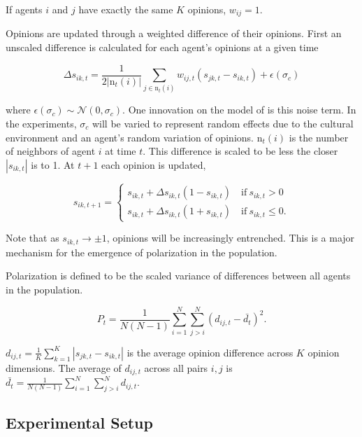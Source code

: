 \documentclass[11pt,letterpaper]{article}
\newcommand{\sigc}{\ensuremath{\sigma_c}}
\begin{document}
\noindent
If agents $i$ and $j$ have exactly the same $K$ opinions, $w_{ij} = 1$. 

Opinions are updated through a weighted difference of their opinions. 
First an unscaled difference is calculated for each agent's opinions at a given time

\begin{equation}
  \Delta s_{ik,t} = \frac{1}{2 |\mathrm{n}_t(i)|} 
    \sum_{j \in \mathrm{n}_t(i)} w_{ij,t} \left(s_{jk,t} - s_{ik,t}\right) + \epsilon(\sigc)
\end{equation}

\noindent 
where $\epsilon(\sigc) \sim \mathcal{N}(0, \sigc)$. One innovation on the
model of  is this noise term. In the experiments,
$\sigc$ will be varied to represent random effects due to the cultural environment
and an agent's random variation of opinions.
$\mathrm{n}_t(i)$ is the number of neighbors of agent $i$ at time $t$.
This difference is scaled to be less the closer $|s_{ik,t}|$ is to 1. At $t+1$
each opinion is updated,

\begin{equation}
  s_{ik,t+1} = \begin{cases}
                  s_{ik,t} + \Delta s_{ik,t}\left(1 - s_{ik,t}\right) 
                      \quad \mathrm{if}~ s_{ik,t} > 0 \\
                  s_{ik,t} + \Delta s_{ik,t}\left(1 + s_{ik,t}\right)
                      \quad \mathrm{if}~ s_{ik,t} \leq 0.
  \end{cases}
\end{equation}

\noindent
Note that as $s_{ik,t} \rightarrow \pm 1$, opinions will be increasingly 
entrenched. This is a major mechanism for the emergence of polarization in the
population. 

Polarization is defined to be the scaled variance of differences between all
agents in the population. 

\begin{equation}
  P_t = \frac{1}{N(N-1)} \sum_{i=1}^{N} \sum_{j>i}^{N} \left(d_{ij,t} - \bar{d_t}\right)^2.
\end{equation}

$d_{ij,t} = \frac{1}{K} \sum_{k=1}^K \left|s_{jk,t} - s_{ik,t}\right|$ is the
average opinion difference across $K$ opinion dimensions. The average of $d_{ij,t}$
across all pairs $i,j$ is $\bar{d_t} = \frac{1}{N(N-1)} \sum_{i=1}^{N} \sum_{j>i}^{N} d_{ij,t}$.


\subsection{Experimental Setup}
\label{sub:Experimental-Setup}
\end{document}
